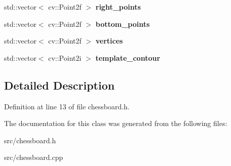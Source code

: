 \begin{DoxyCompactItemize}
\item 
\hypertarget{class_chessboard_a877d70697b755622bdf9b0e1ad5c441e}{}std\+::vector$<$ cv\+::\+Point2f $>$ {\bfseries right\+\_\+points}\label{class_chessboard_a877d70697b755622bdf9b0e1ad5c441e}

\item 
\hypertarget{class_chessboard_a601ac1447dcdb89692f1eaad2f217786}{}std\+::vector$<$ cv\+::\+Point2f $>$ {\bfseries bottom\+\_\+points}\label{class_chessboard_a601ac1447dcdb89692f1eaad2f217786}

\item 
\hypertarget{class_chessboard_a463faa4bf94ddbc54358eb01634920ca}{}std\+::vector$<$ cv\+::\+Point2f $>$ {\bfseries vertices}\label{class_chessboard_a463faa4bf94ddbc54358eb01634920ca}

\item 
\hypertarget{class_chessboard_a8aaff50d8e307ba8a6ce7a1e04095d57}{}std\+::vector$<$ cv\+::\+Point2i $>$ {\bfseries template\+\_\+contour}\label{class_chessboard_a8aaff50d8e307ba8a6ce7a1e04095d57}

\end{DoxyCompactItemize}


\subsection{Detailed Description}


Definition at line 13 of file chessboard.\+h.



The documentation for this class was generated from the following files\+:\begin{DoxyCompactItemize}
\item 
src/chessboard.\+h\item 
src/chessboard.\+cpp\end{DoxyCompactItemize}
